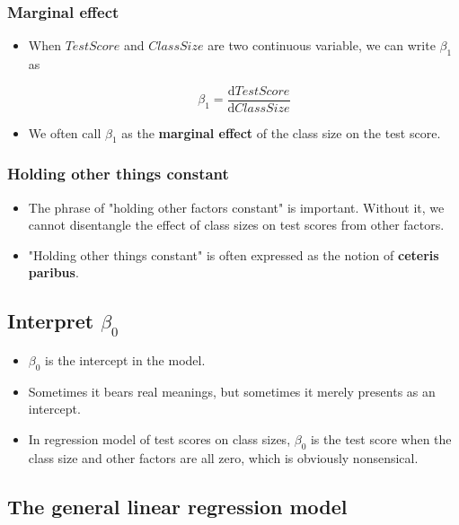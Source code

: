 \documentclass[11pt]{article}
\begin{document}
\subsubsection*{Marginal effect}
\label{sec:org5cdb7e2}

\begin{itemize}
\item When \(TestScore\) and
\(ClassSize\) are two continuous variable, we can write \(\beta_1\) as

\[\beta_1 = \frac{\mathrm{d} TestScore}{\mathrm{d} ClassSize}  \]

\item We often call \(\beta_1\) as the \textbf{marginal effect} of the class
size on the test score.
\end{itemize}

\subsubsection*{Holding other things constant}
\label{sec:org0bf9dae}

\begin{itemize}
\item The phrase of "holding other factors constant" is important. Without
it, we cannot disentangle the effect of class sizes on test scores
from other factors.
\item "Holding other things constant" is often expressed
as the notion of \textbf{ceteris paribus}.
\end{itemize}

\subsection*{Interpret \(\beta_0\)}
\label{sec:orgb3ecc8a}

\begin{itemize}
\item \(\beta_0\) is the intercept in the model.
\item Sometimes it bears real
meanings, but sometimes it merely presents as an intercept.
\item In regression model of test scores on class sizes, \(\beta_0\) is the
test score when the class size and other factors are all zero, which
is obviously nonsensical.
\end{itemize}

\subsection*{The general linear regression model}
\label{sec:org6244ba1}
\end{document}
